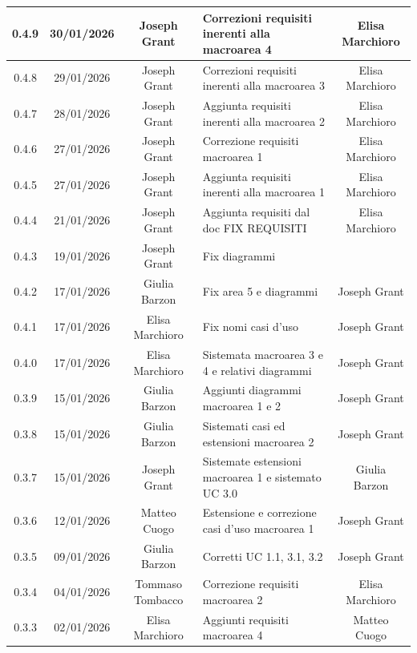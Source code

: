 \documentclass[11pt,a4paper]{article}
\begin{document}
\begin{longtable}[H]{|c|c|c|>{\raggedright\arraybackslash}p{}|c|}
        \hline
        0.4.9 & 30/01/2026 & Joseph Grant & Correzioni requisiti inerenti alla macroarea 4 & Elisa Marchioro\\
        \hline
        0.4.8 & 29/01/2026 & Joseph Grant & Correzioni requisiti inerenti alla macroarea 3 & Elisa Marchioro\\
        \hline
        0.4.7 & 28/01/2026 & Joseph Grant & Aggiunta requisiti inerenti alla macroarea 2 & Elisa Marchioro\\
        \hline
        0.4.6 & 27/01/2026 & Joseph Grant & Correzione requisiti macroarea 1 & Elisa Marchioro\\
        \hline
        0.4.5 & 27/01/2026 & Joseph Grant & Aggiunta requisiti inerenti alla macroarea 1 & Elisa Marchioro\\
        \hline
        0.4.4 & 21/01/2026 & Joseph Grant & Aggiunta requisiti dal doc FIX REQUISITI & Elisa Marchioro \\
        \hline
        0.4.3 & 19/01/2026 & Joseph Grant & Fix diagrammi &  \\
        \hline
        0.4.2 & 17/01/2026 & Giulia Barzon & Fix area 5 e diagrammi & Joseph Grant \\
        \hline
        0.4.1 & 17/01/2026 & Elisa Marchioro & Fix nomi casi d'uso & Joseph Grant \\
        \hline
        0.4.0 & 17/01/2026 & Elisa Marchioro & Sistemata macroarea 3 e 4 e relativi diagrammi & Joseph Grant \\
        \hline
        0.3.9 & 15/01/2026 & Giulia Barzon & Aggiunti diagrammi macroarea 1 e 2 & Joseph Grant \\
        \hline
        0.3.8 & 15/01/2026 & Giulia Barzon & Sistemati casi ed estensioni macroarea 2 & Joseph Grant \\
        \hline
        0.3.7 & 15/01/2026 & Joseph Grant & Sistemate estensioni macroarea 1 e sistemato UC 3.0 & Giulia Barzon\\
        \hline
        0.3.6 & 12/01/2026 & Matteo Cuogo & Estensione e correzione casi d'uso macroarea 1 & Joseph Grant\\
        \hline
        0.3.5 & 09/01/2026 & Giulia Barzon & Corretti UC 1.1, 3.1, 3.2 & Joseph Grant\\
        \hline
        0.3.4 & 04/01/2026 & Tommaso Tombacco & Correzione requisiti macroarea 2 & Elisa Marchioro\\
        \hline
        0.3.3 & 02/01/2026 & Elisa Marchioro & Aggiunti requisiti macroarea 4 &  Matteo Cuogo\\

\end{longtable}
\end{document}
